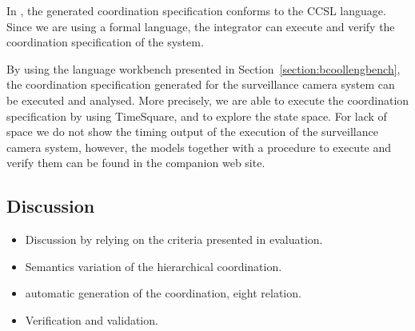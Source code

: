 	In \bcool, the generated coordination specification conforms to the CCSL language. Since we are using a formal language, the integrator can execute and verify the coordination specification of the system.
	
	By using the language workbench presented in Section~\ref{section:bcoollengbench}, the coordination specification generated for the surveillance camera system can be executed and analysed. More precisely, we are able to execute the coordination specification by using TimeSquare, and to explore the state space. For lack of space we do not show the timing output of the execution of the surveillance camera system, however, the models together with a procedure to execute and verify them can be found in the companion web site.
	
	\subsection{Discussion}
	
	\begin{itemize}
		\item Discussion by relying on the criteria presented in evaluation.
		\item Semantics variation of the hierarchical coordination. 
		\item automatic generation of the coordination, eight relation.
		\item Verification and validation. 
	\end{itemize}